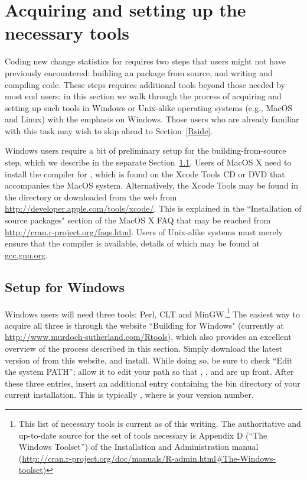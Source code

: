 \documentclass[nojss]{jss}
\begin{document}
\section{Acquiring and setting up the necessary tools}
\label{Tools}

Coding new change statistics for  requires two steps that users might not have previously encountered: building an  package from source, and writing and compiling  code. These steps requires additional tools beyond those needed by most  end users; in this section we walk through the process of acquiring and setting up such tools in Windows or Unix-alike operating systems (e.g., MacOS and Linux) with the emphasis on Windows. Those users who are already familiar with this task may wish to skip ahead to Section~\ref{Rside}.

Windows users require a bit of preliminary setup for the building-from-source
step, which we describe in the separate Section~\ref{AcqTools}.  Users of MacOS X
need to install the 
compiler for , which is found on the Xcode Tools CD or
DVD that accompanies the MacOS system.  Alternatively, the Xcode Tools may
be found in the  directory or downloaded from the
web from \url{http://developer.apple.com/tools/xcode/}.  This is explained in the ``Installation of source packages" section of the
 MacOS X FAQ that may be reached from
\url{http://cran.r-project.org/faqs.html}.  Users of Unix-alike systems must merely
ensure that the  compiler is available, details of which may be
found at \url{gcc.gnu.org}.

\subsection{Setup for Windows}
\label{AcqTools}

Windows users will need three tools: Perl, CLT and MinGW.\footnote{This list of necessary tools is current as of this writing. The authoritative and up-to-date source for the set of tools necessary is Appendix D (``The Windows Toolset'') of the  Installation and Administration manual (\url{http://cran.r-project.org/doc/manuals/R-admin.html\#The-Windows-toolset})} The easiest way to acquire all three is through the website ``Building  for Windows" (currently at \url{http://www.murdoch-sutherland.com/Rtools}), which also provides an excellent overview of the process described in this section.  Simply download the latest version of  from this website, and install.  While doing so, be sure to check ``Edit the system PATH''; allow it to edit your path so that , , and  are up front. After these three entries, insert an additional entry containing the bin directory of your current  installation.  This is typically , where  is your  version number.
\end{document}
